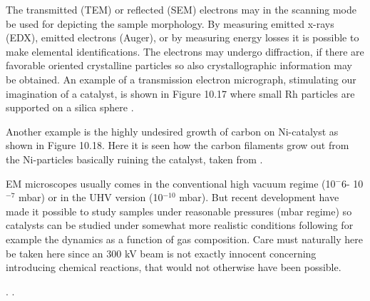 

\vspace{1cm} 

The transmitted (TEM) or reflected (SEM) electrons may in the scanning mode be used for depicting the sample morphology. By measuring emitted x-rays (EDX), emitted electrons (Auger), or by measuring energy losses it is possible to make elemental identifications. The electrons may undergo diffraction, if there are favorable oriented crystalline particles so also crystallographic information may be obtained. An example  of a transmission electron micrograph, stimulating our imagination of a catalyst, is shown in Figure 10.17 where small  Rh particles are supported on a silica sphere  \cite{Datye}.




\vspace{1cm} 


 Another example is the highly undesired growth of carbon on Ni-catalyst as shown in Figure 10.18. Here it is seen how the carbon filaments grow out from the Ni-particles basically ruining the catalyst, taken from \cite{carbon}.



\vspace{1cm} 



EM microscopes usually comes in the conventional high vacuum regime (10$^-6$- 10$^{-7}$ mbar) or   in the UHV version (10$^{-10}$ mbar). But  recent development have made it possible to study samples under reasonable pressures (mbar regime) so catalysts can be studied under somewhat more realistic conditions following for example the dynamics as a function of gas composition. Care must naturally here be taken here since an 300 kV beam is not exactly innocent concerning introducing chemical reactions, that would not otherwise have been possible.





.
\newpage 
.
\newpage
